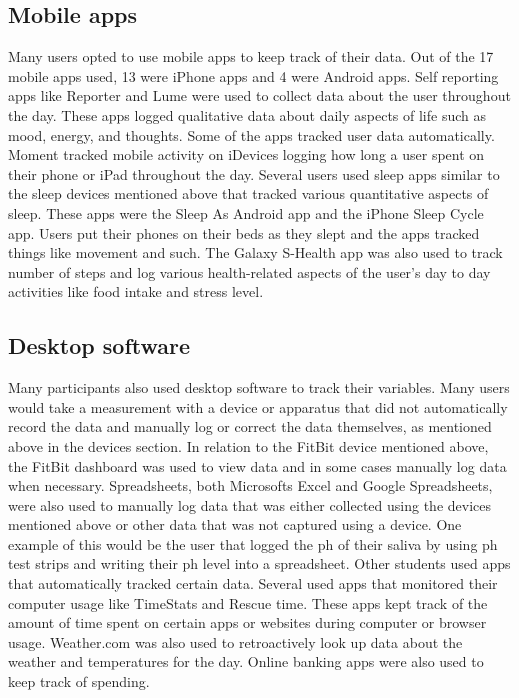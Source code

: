 \subsection{Mobile apps} 
    Many users opted to use mobile apps to keep track of their data. Out of the 17 mobile apps used, 13 were iPhone apps and 4 were Android apps. Self reporting apps like Reporter and Lume were used to collect data about the user throughout the day. These apps logged qualitative data about daily aspects of life such as mood, energy, and thoughts. 
    Some of the apps tracked user data automatically. Moment tracked mobile activity on iDevices logging how long a user spent on their phone or iPad throughout the day. Several users used sleep apps similar to the sleep devices mentioned above that tracked various quantitative aspects of sleep. These apps were the Sleep As Android app and the iPhone Sleep Cycle app. Users put their phones on their beds as they slept and the apps tracked things like movement and such. The Galaxy S-Health app was also used to track number of steps and log various health-related aspects of the user’s day to day activities like food intake and stress level.
    
\subsection{Desktop software} 
    Many participants also used desktop software to track their variables. Many users would take a measurement with a device or apparatus that did not automatically record the data and manually log or correct the data themselves, as mentioned above in the devices section. In relation to the FitBit device mentioned above, the FitBit dashboard was used to view data and in some cases manually log data when necessary. Spreadsheets, both Microsoft\textquotesingle s Excel and Google Spreadsheets, were also used to manually log data that was either collected using the devices mentioned above or other data that was not captured using a device. One example of this would be the user that logged the ph of their saliva by using ph test strips and writing their ph level into a spreadsheet. 
    Other students used apps that automatically tracked certain data. Several used apps that monitored their computer usage like TimeStats and Rescue time. These apps kept track of the amount of time spent on certain apps or websites during computer or browser usage. Weather.com was also used to retroactively look up data about the weather and temperatures for the day. Online banking apps were also used to keep track of spending.